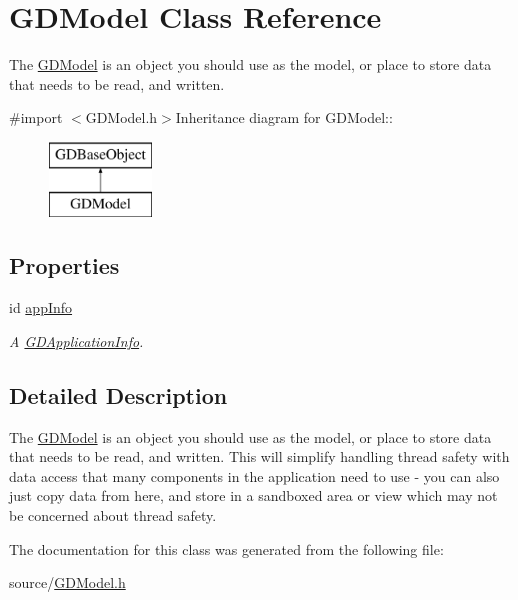 \hypertarget{interface_g_d_model}{
\section{GDModel Class Reference}
\label{interface_g_d_model}
}


The \hyperlink{interface_g_d_model}{GDModel} is an object you should use as the model, or place to store data that needs to be read, and written.  


{\ttfamily \#import $<$GDModel.h$>$}Inheritance diagram for GDModel::\begin{figure}[H]
\begin{center}
\leavevmode
\includegraphics[height=2cm]{interface_g_d_model}
\end{center}
\end{figure}
\subsection*{Properties}
\begin{DoxyCompactItemize}
\item 
\hypertarget{interface_g_d_model_a832bfa58d707cb4e48ec6b7f3a04275b}{
id \hyperlink{interface_g_d_model_a832bfa58d707cb4e48ec6b7f3a04275b}{appInfo}}
\label{interface_g_d_model_a832bfa58d707cb4e48ec6b7f3a04275b}

\begin{DoxyCompactList}\small\item\em A \hyperlink{interface_g_d_application_info}{GDApplicationInfo}. \item\end{DoxyCompactList}\end{DoxyCompactItemize}


\subsection{Detailed Description}
The \hyperlink{interface_g_d_model}{GDModel} is an object you should use as the model, or place to store data that needs to be read, and written. This will simplify handling thread safety with data access that many components in the application need to use -\/ you can also just copy data from here, and store in a sandboxed area or view which may not be concerned about thread safety. 

The documentation for this class was generated from the following file:\begin{DoxyCompactItemize}
\item 
source/\hyperlink{_g_d_model_8h}{GDModel.h}\end{DoxyCompactItemize}
